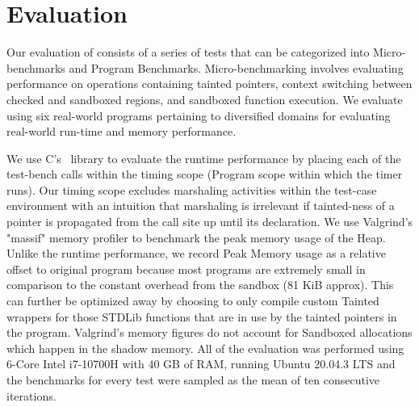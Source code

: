 \section{Evaluation}\label{sec:evaluation}

Our evaluation of \systemname consists of a series of tests that can be categorized into Micro-benchmarks and Program Benchmarks.
Micro-benchmarking involves evaluating performance on operations containing tainted pointers, context switching between checked and sandboxed regions, and sandboxed function execution.
We evaluate \systemname using six real-world programs 
pertaining to diversified domains for evaluating real-world run-time and memory performance.

We use C's~ library to evaluate the runtime performance by placing each of the test-bench calls within the timing scope (Program scope within which the timer runs). Our timing scope excludes marshaling activities within the test-case environment with an intuition that marshaling is irrelevant if tainted-ness of a pointer is propagated from the call site up until its declaration. We use Valgrind's "massif" memory profiler to benchmark the peak memory usage of the Heap. Unlike the runtime performance, we record Peak Memory usage as a relative offset to original program because most programs are extremely small in comparison to the constant overhead from the sandbox (81 KiB approx). This can further be optimized away by choosing to only compile custom Tainted wrappers for those STDLib functions that are in use by the tainted pointers in the program. Valgrind's memory figures do not account for Sandboxed allocations which happen in the shadow memory. 
All of the evaluation was performed using 6-Core Intel i7-10700H with 40 GB of RAM, running Ubuntu 20.04.3 LTS and the benchmarks for every test were sampled as the mean of ten consecutive iterations.

